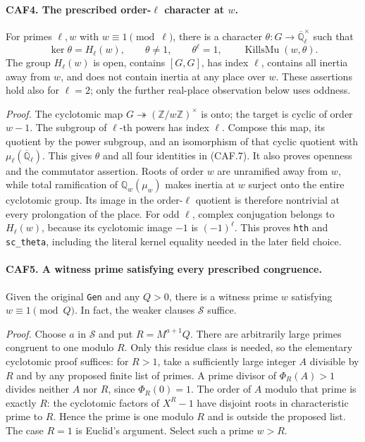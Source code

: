 \paragraph{CAF4. The prescribed order-\(\ell\) character at \(w\).}
\label{claim:CAF4}
For primes \(\ell,w\) with \(w\equiv1\pmod\ell\), there is a
character \(\theta:G\to\overline{\mathbb Q}_\ell^\times\) such that
\[
 \ker\theta=H_\ell(w),\qquad \theta\ne1,
 \qquad\theta^\ell=1,
 \qquad\operatorname{KillsMu}(w,\theta).
 \tag{CAF.7}
\]
The group \(H_\ell(w)\) is open, contains \([G,G]\), has index
\(\ell\), contains all inertia away from \(w\), and does not
contain inertia at any place over \(w\).  These assertions hold also
for \(\ell=2\); only the further real-place observation below uses
oddness.

\emph{Proof.}
The cyclotomic map \(G\twoheadrightarrow
(\mathbb Z/w\mathbb Z)^\times\) is onto; the target is cyclic of
order \(w-1\).  The subgroup of \(\ell\)-th powers has index
\(\ell\).  Compose this map, its quotient by the power subgroup,
and an isomorphism of that cyclic quotient with
\(\mu_\ell(\overline{\mathbb Q}_\ell)\).  This gives \(\theta\)
and all four identities in (CAF.7).  It also proves openness and
the commutator assertion.  Roots of order \(w\) are unramified away
from \(w\), while total ramification of
\(\mathbb Q_w(\mu_w)\) makes inertia at \(w\) surject onto the
entire cyclotomic group.  Its image in the order-\(\ell\) quotient
is therefore nontrivial at every prolongation of the place.  For odd
\(\ell\), complex conjugation belongs to \(H_\ell(w)\), because
its cyclotomic image \(-1\) is \((-1)^\ell\).
This proves \texttt{hth} and \texttt{sc\_theta}, including the
literal kernel equality needed in the later field choice.

\paragraph{CAF5. A witness prime satisfying every prescribed congruence.}
\label{claim:CAF5}
Given the original \texttt{Gen} and any \(Q>0\), there is a witness
prime \(w\) satisfying \(w\equiv1\pmod Q\).  In fact, the
weaker clauses \(\mathcal S\) suffice.

\emph{Proof.}
Choose \(a\) in \(\mathcal S\) and put \(R=M^{a+1}Q\).  There
are arbitrarily large primes congruent to one modulo \(R\).
Only this residue class is needed, so the elementary cyclotomic proof
suffices: for \(R>1\), take a sufficiently large integer \(A\)
divisible by \(R\)
and by any proposed finite list of primes.  A prime divisor of
\(\Phi_R(A)>1\) divides neither \(A\) nor \(R\), since
\(\Phi_R(0)=1\).  The order of \(A\) modulo that prime is exactly
\(R\): the cyclotomic factors of \(X^R-1\) have disjoint roots
in characteristic prime to \(R\).  Hence the prime is one modulo
\(R\) and is outside the proposed list.  The case \(R=1\) is
Euclid's argument.  Select such a prime \(w>R\).

